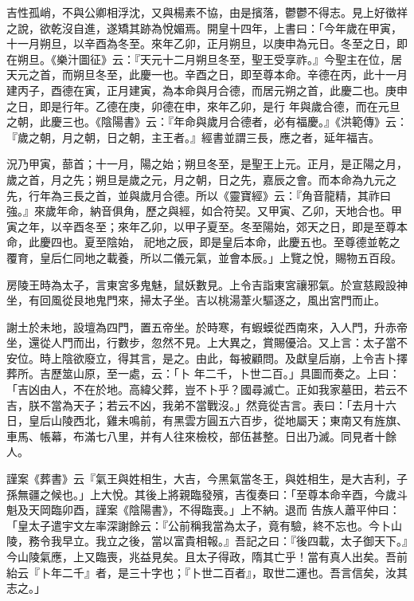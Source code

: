 \begin{pinyinscope}
 吉性孤峭，不與公卿相浮沈，又與楊素不協，由是擯落，鬱鬱不得志。見上好徵祥之說，欲乾沒自進，遂矯其跡為悅媚焉。開皇十四年，上書曰：「今年歲在甲寅，十一月朔旦，以辛酉為冬至。來年乙卯，正月朔旦，以庚申為元日。冬至之日，即在朔旦。《樂汁圖征》云：『天元十二月朔旦冬至，聖王受享祚。』今聖主在位，居天元之首，而朔旦冬至，此慶一也。辛酉之日，即至尊本命。辛德在丙，此十一月建丙子，酉德在寅，正月建寅，為本命與月合德，而居元朔之首，此慶二也。庚申之日，即是行年。乙德在庚，卯德在申，來年乙卯，是行
 年與歲合德，而在元旦之朝，此慶三也。《陰陽書》云：『年命與歲月合德者，必有福慶。』《洪範傳》云：『歲之朝，月之朝，日之朝，主王者。』經書並謂三長，應之者，延年福吉。



 況乃甲寅，蔀首；十一月，陽之始；朔旦冬至，是聖王上元。正月，是正陽之月，歲之首，月之先；朔旦是歲之元，月之朝，日之先，嘉辰之會。而本命為九元之先，行年為三長之首，並與歲月合德。所以《靈寶經》云：『角音龍精，其祚曰強。』來歲年命，納音俱角，歷之與經，如合符契。又甲寅、乙卯，天地合也。甲寅之年，以辛酉冬至；來年乙卯，以甲子夏至。冬至陽始，郊天之日，即是至尊本命，此慶四也。夏至陰始，
 祀地之辰，即是皇后本命，此慶五也。至尊德並乾之覆育，皇后仁同地之載養，所以二儀元氣，並會本辰。」上覽之悅，賜物五百段。



 房陵王時為太子，言東宮多鬼魅，鼠妖數見。上令吉詣東宮禳邪氣。於宣慈殿設神坐，有回風從艮地鬼門來，掃太子坐。吉以桃湯葦火驅逐之，風出宮門而止。



 謝土於未地，設壇為四門，置五帝坐。於時寒，有蝦蟆從西南來，入人門，升赤帝坐，還從人門而出，行數步，忽然不見。上大異之，賞賜優洽。又上言：太子當不安位。時上陰欲廢立，得其言，是之。由此，每被顧問。及獻皇后崩，上令吉卜擇葬所。吉歷筮山原，至一處，云：「卜
 年二千，卜世二百。」具圖而奏之。上曰：「吉凶由人，不在於地。高緯父葬，豈不卜乎？國尋滅亡。正如我家墓田，若云不吉，朕不當為天子；若云不凶，我弟不當戰沒。」然竟從吉言。表曰：「去月十六日，皇后山陵西北，雞未鳴前，有黑雲方圓五六百步，從地屬天；東南又有旌旗、車馬、帳幕，布滿七八里，并有人往來檢校，部伍甚整。日出乃滅。同見者十餘人。



 謹案《葬書》云『氣王與姓相生，大吉，今黑氣當冬王，與姓相生，是大吉利，子孫無疆之候也。」上大悅。其後上將親臨發殯，吉復奏曰：「至尊本命辛酉，今歲斗魁及天岡臨卯酉，謹案《陰陽書》，不得臨喪。」上不納。退而
 告族人蕭平仲曰：「皇太子遣宇文左率深謝餘云：『公前稱我當為太子，竟有驗，終不忘也。今卜山陵，務令我早立。我立之後，當以富貴相報。』吾記之曰：『後四載，太子御天下。』今山陵氣應，上又臨喪，兆益見矣。且太子得政，隋其亡乎！當有真人出矣。吾前紿云『卜年二千』者，是三十字也；『卜世二百者』，取世二運也。吾言信矣，汝其志之。」




\end{pinyinscope}
